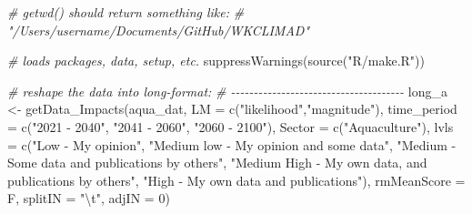 \documentclass[
]{article}
\newenvironment{Shaded}{\begin{snugshade}}{\end{snugshade}}
\newcommand{\AttributeTok}[1]{\textcolor[rgb]{0.77,0.63,0.00}{#1}}
\newcommand{\CommentTok}[1]{\textcolor[rgb]{0.56,0.35,0.01}{\textit{#1}}}
\newcommand{\DecValTok}[1]{\textcolor[rgb]{0.00,0.00,0.81}{#1}}
\newcommand{\FunctionTok}[1]{\textcolor[rgb]{0.00,0.00,0.00}{#1}}
\newcommand{\NormalTok}[1]{#1}
\newcommand{\OtherTok}[1]{\textcolor[rgb]{0.56,0.35,0.01}{#1}}
\newcommand{\SpecialCharTok}[1]{\textcolor[rgb]{0.00,0.00,0.00}{#1}}
\newcommand{\StringTok}[1]{\textcolor[rgb]{0.31,0.60,0.02}{#1}}
\begin{document}
\begin{Shaded}
\begin{Highlighting}[]
   \CommentTok{\# getwd()  should return something like:}
   \CommentTok{\# "/Users/username/Documents/GitHub/WKCLIMAD"}

   \CommentTok{\# loads packages, data, setup, etc.}
    \FunctionTok{suppressWarnings}\NormalTok{(}\FunctionTok{source}\NormalTok{(}\StringTok{"R/make.R"}\NormalTok{))}
    
    \CommentTok{\# reshape the data into long{-}format:}
    \CommentTok{\# {-}{-}{-}{-}{-}{-}{-}{-}{-}{-}{-}{-}{-}{-}{-}{-}{-}{-}{-}{-}{-}{-}{-}{-}{-}{-}{-}{-}{-}{-}{-}{-}{-}{-}{-}{-}{-}{-}}
\NormalTok{    long\_a }\OtherTok{\textless{}{-}} \FunctionTok{getData\_Impacts}\NormalTok{(aqua\_dat,}
                     \AttributeTok{LM  =} \FunctionTok{c}\NormalTok{(}\StringTok{"likelihood"}\NormalTok{,}\StringTok{"magnitude"}\NormalTok{),}
                    \AttributeTok{time\_period  =} \FunctionTok{c}\NormalTok{(}\StringTok{"2021 {-} 2040"}\NormalTok{, }\StringTok{"2041 {-} 2060"}\NormalTok{, }\StringTok{"2060 {-} 2100"}\NormalTok{),}
                    \AttributeTok{Sector  =} \FunctionTok{c}\NormalTok{(}\StringTok{"Aquaculture"}\NormalTok{),}
                    \AttributeTok{lvls  =} \FunctionTok{c}\NormalTok{(}\StringTok{"Low  {-} My opinion"}\NormalTok{,}
                              \StringTok{"Medium low {-} My opinion and some data"}\NormalTok{,}
                              \StringTok{"Medium {-} Some data and publications by others"}\NormalTok{,}
                              \StringTok{"Medium High {-} My own data, and publications by others"}\NormalTok{,}
                              \StringTok{"High {-} My own data and publications"}\NormalTok{),}
                    \AttributeTok{rmMeanScore =}\NormalTok{ F, }
                    \AttributeTok{splitIN =} \StringTok{"}\SpecialCharTok{\textbackslash{}t}\StringTok{"}\NormalTok{,}
                    \AttributeTok{adjIN =} \DecValTok{0}\NormalTok{)}
                    

\end{Highlighting}
\end{Shaded}
\end{document}
